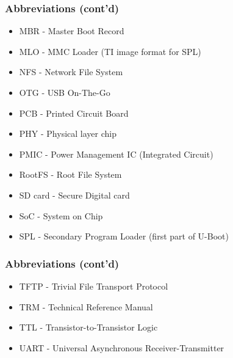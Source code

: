 \begin{frame}
  \frametitle{Abbreviations (cont'd)}
  \begin{itemize}
    \item MBR - Master Boot Record
    \item MLO - MMC Loader (TI image format for SPL)
    \item NFS - Network File System
    \item OTG - USB On-The-Go
    \item PCB - Printed Circuit Board
    \item PHY - Physical layer chip
    \item PMIC - Power Management IC (Integrated Circuit)
    \item RootFS - Root File System
    \item SD card - Secure Digital card
    \item SoC - System on Chip
    \item SPL - Secondary Program Loader (first part of U-Boot)
  \end{itemize}
\end{frame}

\begin{frame}
  \frametitle{Abbreviations (cont'd)}
  \begin{itemize}
    \item TFTP - Trivial File Transport Protocol
    \item TRM - Technical Reference Manual
    \item TTL - Transistor-to-Transistor Logic
    \item UART - Universal Asynchronous Receiver-Transmitter
  \end{itemize}
\end{frame}


